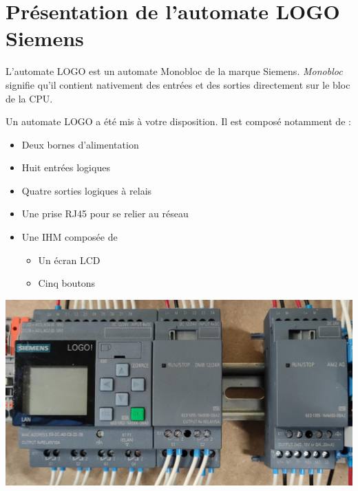 \section{Présentation de l'automate \textbf{LOGO} Siemens}



L'automate LOGO est un automate Monobloc de la marque Siemens. 
\textit{Monobloc} signifie qu'il contient nativement des entrées et des sorties directement sur le bloc de la CPU. 



\begin{UPSTIactivite}
    Un automate LOGO a été mis à votre disposition. Il est composé notamment de : 
    \begin{itemize}
        \item Deux bornes d'alimentation
        \item Huit entrées logiques
        \item Quatre sorties logiques à relais
        \item Une prise RJ45 pour se relier au réseau
        \item Une IHM composée de
        \begin{itemize}
            \item Un écran LCD
            \item Cinq boutons 
        \end{itemize}
    \end{itemize}


    \begin{center}
        \includegraphics[width=.6\textwidth, height=.35\textheight,keepaspectratio]{images/maquette_logo.jpg}
    \end{center}

\end{UPSTIactivite}


